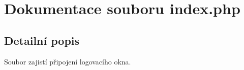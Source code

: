 \section{Dokumentace souboru index.php}
\label{index_8php}


\subsection{Detailní popis}
Soubor zajistí připojení logovacího okna. 